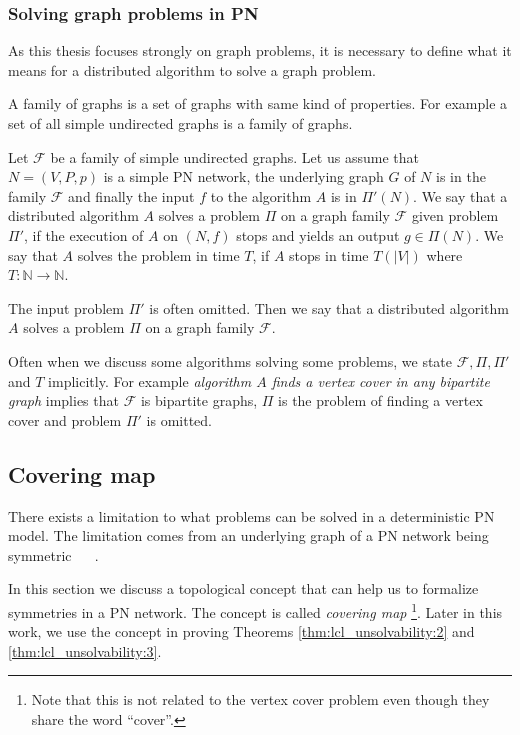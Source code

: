 
\subsubsection{Solving graph problems in PN}
As this thesis focuses strongly on graph problems, it is necessary to define what it means for a distributed algorithm to solve a graph problem.

A family of graphs is a set of graphs with same kind of properties.
For example a set of all simple undirected graphs is a family of graphs.

Let $\mathcal{F}$ be a family of simple undirected graphs.
Let us assume that $N=(V, P, p)$ is a simple PN network, the underlying graph $G$ of $N$ is in the family $\mathcal{F}$ and finally the input $f$ to the algorithm $A$ is in $\Pi'(N)$.
We say that a distributed algorithm $A$ solves a problem $\Pi$ on a graph family $\mathcal{F}$ given problem $\Pi'$, if the execution of $A$ on $(N, f)$ stops and yields an output $g \in \Pi(N)$.
We say that $A$ solves the problem in time $T$, if $A$ stops in time $T(|V|)$ where $T\colon \mathbb{N} \rightarrow \mathbb{N}$.

The input problem $\Pi'$ is often omitted.
Then we say that a distributed algorithm $A$ solves a problem $\Pi$ on a graph family $\mathcal{F}$.

Often when we discuss some algorithms solving some problems, we state $\mathcal{F}, \Pi, \Pi'$ and $T$ implicitly.
For example \emph{algorithm $A$ finds a vertex cover in any bipartite graph} implies that $\mathcal{F}$ is bipartite graphs, $\Pi$ is the problem of finding a vertex cover and problem $\Pi'$ is omitted.



\subsection{Covering map} \label{sec:covering_map}
There exists a limitation to what problems can be solved in a deterministic PN model.
The limitation comes from an underlying graph of a PN network being symmetric~%
\cite{DBLP:conf/focs/Linial87}~%
\cite{DBLP:journals/siamcomp/Linial92}.

In this section we discuss a topological concept that can help us to formalize symmetries in a PN network.
The concept is called \emph{covering map}%
\footnote{Note that this is not related to the vertex cover problem even though they share the word ``cover''.}.
Later in this work, we use the concept in proving Theorems \ref{thm:lcl_unsolvability:2} and \ref{thm:lcl_unsolvability:3}.

